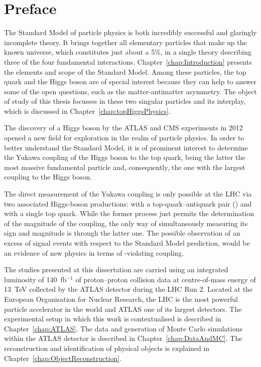 
\chapter*{Preface}



The Standard Model of particle physics is both incredibly successful and glaringly incomplete theory. 
It brings together all elementary particles that make up the known universe, which constitutes just about a 5\%, in a single theory describing three of the four
fundamental interactions.
Chapter~\ref{chap:Introduction} presents the elements and scope of the Standard Model.
Among these particles, the top quark and the Higgs boson are of special
interest because they can help to answer some of the open questions, such as the matter-antimatter asymmetry.  
The object of study of this thesis focusses in these two 
singular particles and its interplay, which is discussed in Chapter~\ref{chap:topHiggsPhysics}.

The discovery of a Higgs boson by the ATLAS and CMS experiments in 2012 opened 
a new field for exploration in the realm of particle physics. In order to better understand the
Standard Model, it is of prominent interest to determine the Yukawa coupling of 
the Higgs boson to the top quark, being the latter the most massive fundamental particle 
and, consequently, the one with the largest coupling to the Higgs boson.



The direct measurement of the Yukawa coupling is only possible at the LHC via two associated
Higgs-boson productions: with a top-quark--antiquark pair (\ttH) and with a single top quark.
While the former process just permits the determination of the magnitude of the coupling, the only way of simultaneously 
measuring its sign and magnitude is through the latter one. The possible observation of an excess 
of signal events with respect to the Standard Model prediction, would be an 
evidence of new physics in terms of \CP-violating coupling.

The studies presented at this dissertation are carried using an integrated luminosity of 140~fb$^{-1}$ 
of proton--proton collision data at centre-of-mass energy of 13~TeV collected by the ATLAS detector during the 
LHC Run 2. Located at the European Organisation for Nuclear Research,
the LHC is the most powerful particle accelerator in the world and ATLAS one of its largest detectors. The experimental 
setup in which this work is contextualised is described in Chapter~\ref{chap:ATLAS}. The data and generation
of Monte Carlo simulations within the ATLAS detector is described in Chapter~\ref{chap:DataAndMC}. The reconstruction 
and identification of physical objects is explained in Chapter~\ref{chap:ObjectReconstruction}.

